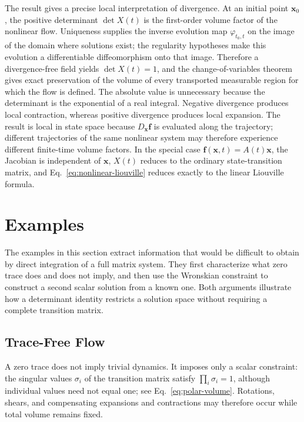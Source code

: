 \documentclass[11pt,a4paper]{article}
\theoremstyle{definition}
\numberwithin{equation}{section}
\begin{document}
The result gives a precise local interpretation of divergence. At an initial point $\mathbf x_0$, the positive determinant $\det X(t)$ is the first-order volume factor of the nonlinear flow. Uniqueness supplies the inverse evolution map $\varphi_{t_0,t}$ on the image of the domain where solutions exist; the regularity hypotheses make this evolution a differentiable diffeomorphism onto that image. Therefore a divergence-free field yields $\det X(t)=1$, and the change-of-variables theorem gives exact preservation of the volume of every transported measurable region for which the flow is defined. The absolute value is unnecessary because the determinant is the exponential of a real integral. Negative divergence produces local contraction, whereas positive divergence produces local expansion. The result is local in state space because $D_{\mathbf x}\mathbf f$ is evaluated along the trajectory; different trajectories of the same nonlinear system may therefore experience different finite-time volume factors. In the special case $\mathbf f(\mathbf x,t)=A(t)\mathbf x$, the Jacobian is independent of $\mathbf x$, $X(t)$ reduces to the ordinary state-transition matrix, and Eq.~\eqref{eq:nonlinear-liouville} reduces exactly to the linear Liouville formula.

\section{Examples}

The examples in this section extract information that would be difficult to obtain by direct integration of a full matrix system. They first characterize what zero trace does and does not imply, and then use the Wronskian constraint to construct a second scalar solution from a known one. Both arguments illustrate how a determinant identity restricts a solution space without requiring a complete transition matrix.

\subsection{Trace-Free Flow}

A zero trace does not imply trivial dynamics. It imposes only a scalar constraint: the singular values $\sigma_i$ of the transition matrix satisfy $\prod_i\sigma_i=1$, although individual values need not equal one; see Eq.~\eqref{eq:polar-volume}. Rotations, shears, and compensating expansions and contractions may therefore occur while total volume remains fixed.
\end{document}
